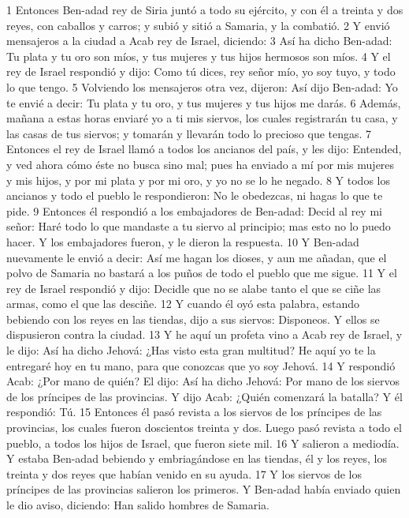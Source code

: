 1 Entonces Ben-adad rey de Siria juntó a todo su ejército, y con él a treinta y dos reyes, con caballos y carros; y subió y sitió a Samaria, y la combatió.
2 Y envió mensajeros a la ciudad a Acab rey de Israel, diciendo:
3 Así ha dicho Ben-adad: Tu plata y tu oro son míos, y tus mujeres y tus hijos hermosos son míos.
4 Y el rey de Israel respondió y dijo: Como tú dices, rey señor mío, yo soy tuyo, y todo lo que tengo.
5 Volviendo los mensajeros otra vez, dijeron: Así dijo Ben-adad: Yo te envié a decir: Tu plata y tu oro, y tus mujeres y tus hijos me darás.
6 Además, mañana a estas horas enviaré yo a ti mis siervos, los cuales registrarán tu casa, y las casas de tus siervos; y tomarán y llevarán todo lo precioso que tengas.
7 Entonces el rey de Israel llamó a todos los ancianos del país, y les dijo: Entended, y ved ahora cómo éste no busca sino mal; pues ha enviado a mí por mis mujeres y mis hijos, y por mi plata y por mi oro, y yo no se lo he negado.
8 Y todos los ancianos y todo el pueblo le respondieron: No le obedezcas, ni hagas lo que te pide.
9 Entonces él respondió a los embajadores de Ben-adad: Decid al rey mi señor: Haré todo lo que mandaste a tu siervo al principio; mas esto no lo puedo hacer. Y los embajadores fueron, y le dieron la respuesta.
10 Y Ben-adad nuevamente le envió a decir: Así me hagan los dioses, y aun me añadan, que el polvo de Samaria no bastará a los puños de todo el pueblo que me sigue.
11 Y el rey de Israel respondió y dijo: Decidle que no se alabe tanto el que se ciñe las armas, como el que las desciñe.
12 Y cuando él oyó esta palabra, estando bebiendo con los reyes en las tiendas, dijo a sus siervos: Disponeos. Y ellos se dispusieron contra la ciudad.
13 Y he aquí un profeta vino a Acab rey de Israel, y le dijo: Así ha dicho Jehová: ¿Has visto esta gran multitud? He aquí yo te la entregaré hoy en tu mano, para que conozcas que yo soy Jehová.
14 Y respondió Acab: ¿Por mano de quién? El dijo: Así ha dicho Jehová: Por mano de los siervos de los príncipes de las provincias. Y dijo Acab: ¿Quién comenzará la batalla? Y él respondió: Tú.
15 Entonces él pasó revista a los siervos de los príncipes de las provincias, los cuales fueron doscientos treinta y dos. Luego pasó revista a todo el pueblo, a todos los hijos de Israel, que fueron siete mil.
16 Y salieron a mediodía. Y estaba Ben-adad bebiendo y embriagándose en las tiendas, él y los reyes, los treinta y dos reyes que habían venido en su ayuda.
17 Y los siervos de los príncipes de las provincias salieron los primeros. Y Ben-adad había enviado quien le dio aviso, diciendo: Han salido hombres de Samaria.
